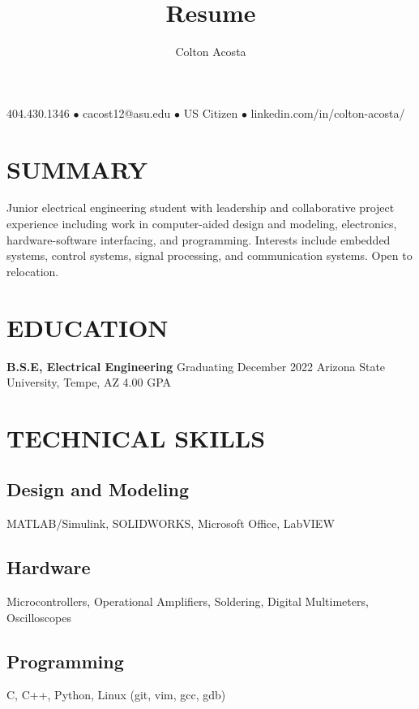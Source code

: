 \documentclass{article}
\makeatletter
\renewcommand{\maketitle}{
	\begin{center}
		{\huge\bfseries
			\theauthor}
			
		404.430.1346 $\bullet$ cacost12@asu.edu $\bullet$ US Citizen $\bullet$ linkedin.com/in/colton-acosta/
	\end{center}
}
\makeatother
\begin{document}
\title{Resume}
\author{Colton Acosta}
\maketitle
\section{SUMMARY}
Junior electrical engineering student with leadership and collaborative project experience including work in computer-aided design and modeling, electronics, hardware-software interfacing, and programming. Interests include embedded systems, control systems, signal processing, and communication systems. Open to relocation.
\section{EDUCATION}
\textbf{B.S.E, Electrical Engineering}
\hfill 
Graduating December 2022
\linebreak
Arizona State University, Tempe, AZ 
\hfill
4.00 GPA

\section{TECHNICAL SKILLS}
\subsection{Design and Modeling}
MATLAB/Simulink, SOLIDWORKS, Microsoft Office, LabVIEW
\subsection{Hardware}
Microcontrollers, Operational Amplifiers, Soldering, Digital Multimeters, Oscilloscopes
\subsection{Programming} 
C, C++, Python, Linux (git, vim, gcc, gdb)
\end{document}
